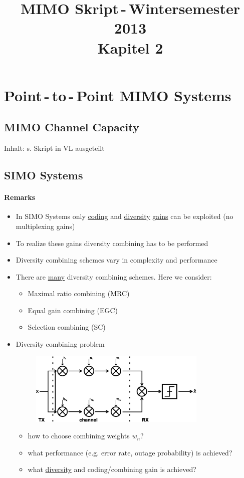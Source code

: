 \documentclass[a4paper, 10pt]{article}
\title{MIMO Skript\,-\,Wintersemester 2013 \\ Kapitel 2}
\date{}
\begin{document}
\maketitle
\tableofcontents
\setcounter{section}{1}
\section{Point\,-\,to\,-\,Point MIMO Systems}
\subsection{MIMO Channel Capacity}
Inhalt: s. Skript in VL ausgeteilt
\subsection{SIMO Systems}
\paragraph{Remarks}
\begin{itemize}
	\item In SIMO Systems only \underline{coding} and \underline{diversity} \underline{gains} can be exploited (no multiplexing gains)
	\item To realize these gains diversity combining has to be performed
	\item Diversity combining schemes vary in complexity and performance
	\item There are \underline{many} diversity combining schemes. Here we consider:
	\begin{itemize}
		\item Maximal ratio combining (MRC)
		\item Equal gain combining (EGC)
		\item Selection combining (SC)
	\end{itemize}
	\item Diversity combining problem
	\begin{figure}[h]\centering
		\includegraphics[width=0.8\textwidth]{Multi_Channel}
	\end{figure}		
	
	\begin{itemize}
		\item how to choose combining weights $w_n$?
		\item what performance (e.g. error rate, outage probability) is achieved?
		\item what \underline{diversity} and coding/combining gain is achieved?
	\end{itemize}
\end{itemize}
\end{document}
